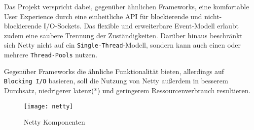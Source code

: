 Das Projekt verspricht dabei, gegenüber ähnlichen Frameworks, eine komfortable User Experience durch eine einheitliche API für
blockierende und nicht-blockierende I/O-Sockets. Das flexible und erweiterbare Event-Modell erlaubt zudem eine saubere Trennung der Zuständigkeiten.
Darüber hinaus beschränkt sich Netty nicht auf ein \verb|Single-Thread|-Modell, sondern kann auch einen oder mehrere \verb|Thread-Pools| nutzen.

Gegenüber Frameworks die ähnliche Funktionalität bieten, allerdings auf \verb|Blocking I/O| basieren,
soll die Nutzung von Netty außerdem
in besserem Durchsatz, niedrigerer \Gls{latenz}(*) und geringerem Ressourcenverbrauch resultieren. \parencite{Netty}

\begin{figure}[h!]
  \centering
  \texttt{[image: netty]}
  \caption{Netty Komponenten \parencite{Netty}}
  \label{fig:netty}
\end{figure}